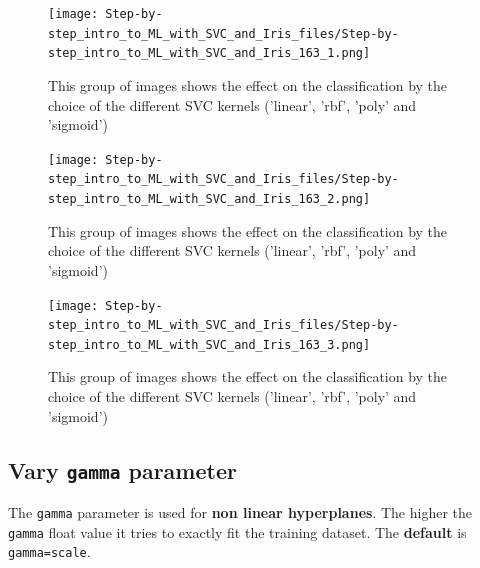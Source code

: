 \documentclass [oneside,10pt,a4paper,ngerman,BCOR10mm,headsepline,parindent,final]{scrartcl}
\begin{document}
    \begin{figure}
        \begin{center}\texttt{[image: Step-by-step\_intro\_to\_ML\_with\_SVC\_and\_Iris\_files/Step-by-step\_intro\_to\_ML\_with\_SVC\_and\_Iris\_163\_1.png]}\end{center}
        \caption{This group of images shows the effect on the classification by the choice of the different SVC kernels ('linear', 'rbf', 'poly' and 'sigmoid')}
        \label{fig:vary_kernels}
    \end{figure}
    
    \begin{figure}
        \begin{center}\texttt{[image: Step-by-step\_intro\_to\_ML\_with\_SVC\_and\_Iris\_files/Step-by-step\_intro\_to\_ML\_with\_SVC\_and\_Iris\_163\_2.png]}\end{center}
        \caption{This group of images shows the effect on the classification by the choice of the different SVC kernels ('linear', 'rbf', 'poly' and 'sigmoid')}
        \label{fig:vary_kernels}
    \end{figure}
    
    \begin{figure}
        \begin{center}\texttt{[image: Step-by-step\_intro\_to\_ML\_with\_SVC\_and\_Iris\_files/Step-by-step\_intro\_to\_ML\_with\_SVC\_and\_Iris\_163\_3.png]}\end{center}
        \caption{This group of images shows the effect on the classification by the choice of the different SVC kernels ('linear', 'rbf', 'poly' and 'sigmoid')}
        \label{fig:vary_kernels}
    \end{figure}
    
    \hypertarget{vary-gamma-parameter}{%
\subsection{\texorpdfstring{Vary \texttt{gamma}
parameter}{Vary gamma parameter}}\label{vary-gamma-parameter}}

The \texttt{gamma} parameter is used for \textbf{non linear
hyperplanes}. The higher the \texttt{gamma} float value it tries to
exactly fit the training dataset. The \textbf{default} is
\texttt{gamma=\textquotesingle{}scale\textquotesingle{}}.
\end{document}
